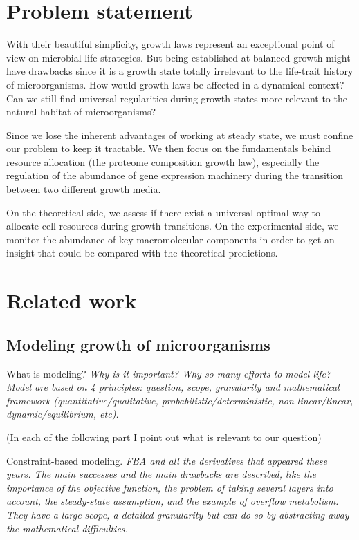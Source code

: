 \section{Problem statement}

With their beautiful simplicity, growth laws represent an exceptional point of view on microbial life strategies.
But being established at balanced growth might have drawbacks since it is a growth state totally irrelevant to the life-trait history of microorganisms.
How would growth laws be affected in a dynamical context?
Can we still find universal regularities during growth states more relevant to the natural habitat of microorganisms?

Since we lose the inherent advantages of working at steady state, we must confine our problem to keep it tractable.
We then focus on the fundamentals behind resource allocation (the proteome composition growth law), especially the regulation of the abundance of gene expression machinery during the transition between two different growth media.

On the theoretical side, we assess if there exist a universal optimal way to allocate cell resources during growth transitions.
On the experimental side, we monitor the abundance of key macromolecular components in order to get an insight that could be compared with the theoretical predictions.

\section{Related work}

\subsection{Modeling growth of microorganisms}

What is modeling?
\textit{Why is it important?
Why so many efforts to model life?
Model are based on 4 principles: question, scope, granularity and mathematical framework (quantitative/qualitative, probabilistic/deterministic, non-linear/linear, dynamic/equilibrium, etc).}

(In each of the following part I point out what is relevant to our question)

Constraint-based modeling.
\textit{FBA and all the derivatives that appeared these years.
The main successes and the main drawbacks are described, like the importance of the objective function, the problem of taking several layers into account, the steady-state assumption, and the example of overflow metabolism.
They have a large scope, a detailed granularity but can do so by abstracting away the mathematical difficulties.}

